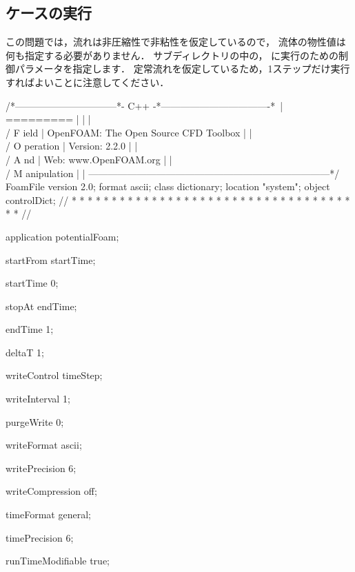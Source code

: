 \subsection{ケースの実行}
\label{ssec:3.1.5}
この問題では，流れは非圧縮性で非粘性を仮定しているので，
流体の物性値は何も指定する必要がありません．
%
%
サブディレクトリの中の，
に実行のための制御パラメータを指定します．
定常流れを仮定しているため，1ステップだけ実行すればよいことに注意してください．
\begin{OFverbatim}
/*--------------------------------*- C++ -*----------------------------------*\
| =========                 |                                                 |
| \\      /  F ield         | OpenFOAM: The Open Source CFD Toolbox           |
|  \\    /   O peration     | Version:  2.2.0                                 |
|   \\  /    A nd           | Web:      www.OpenFOAM.org                      |
|    \\/     M anipulation  |                                                 |
\*---------------------------------------------------------------------------*/
FoamFile
{
    version     2.0;
    format      ascii;
    class       dictionary;
    location    "system";
    object      controlDict;
}
// * * * * * * * * * * * * * * * * * * * * * * * * * * * * * * * * * * * * * //

application     potentialFoam;

startFrom       startTime;

startTime       0;

stopAt          endTime;

endTime         1;

deltaT          1;

writeControl    timeStep;

writeInterval   1;

purgeWrite      0;

writeFormat     ascii;

writePrecision  6;

writeCompression off;

timeFormat      general;

timePrecision   6;

runTimeModifiable true;


\end{OFverbatim}
